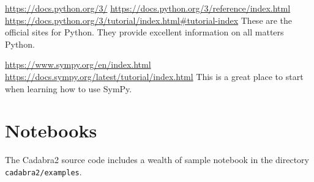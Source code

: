 \documentclass[a4paper,12pt]{article}
\numberwithin{equation}{section}%
\begin{document}
\url{https://docs.python.org/3/}\Break
\url{https://docs.python.org/3/reference/index.html}\Break
\url{https://docs.python.org/3/tutorial/index.html#tutorial-index}\Break
These are the official sites for Python. They provide excellent information on all matters
Python.

\url{https://www.sympy.org/en/index.html}\Break
\url{https://docs.sympy.org/latest/tutorial/index.html}\Break
This is a great place to start when learning how to use SymPy.

\section*{Notebooks}

The Cadabra2 source code includes a wealth of sample notebook in the directory
\verb|cadabra2/examples|.

\printbibliography  %

% 
\end{document}

